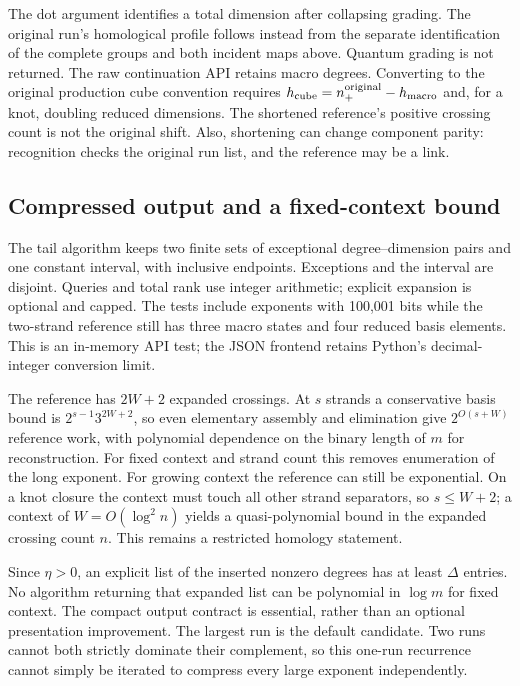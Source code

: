 The dot argument identifies a total dimension after collapsing grading.
The original run's homological profile follows instead from the separate
identification of the complete groups and both incident maps above.
Quantum grading is not returned. The raw continuation API retains macro
degrees. Converting to the original production cube convention requires
$h_{\rm cube}=n_+^{\rm original}-h_{\rm macro}$ and, for a knot, doubling
reduced dimensions. The shortened reference's positive crossing count is
not the original shift. Also, shortening can change component parity:
recognition checks the original run list, and the reference may be a link.

\subsection{Compressed output and a fixed-context bound}
The tail algorithm keeps two finite sets of exceptional degree--dimension
pairs and one constant interval, with inclusive endpoints. Exceptions and
the interval are disjoint. Queries and total rank use integer arithmetic;
explicit expansion is optional and capped. The tests include exponents with
100,001 bits while the two-strand reference still has three macro states
and four reduced basis elements. This is an in-memory API test; the JSON
frontend retains Python's decimal-integer conversion limit.

The reference has $2W+2$ expanded crossings. At $s$ strands a conservative
basis bound is $2^{s-1}3^{2W+2}$, so even elementary assembly and elimination
give $2^{O(s+W)}$ reference work, with polynomial dependence on the binary
length of $m$ for reconstruction. For fixed context and strand count this
removes enumeration of the long exponent. For growing context the reference
can still be exponential. On a knot closure the context must touch all
other strand separators, so $s\le W+2$; a context of
$W=O(\log^2 n)$ yields a quasi-polynomial bound in the expanded crossing
count $n$. This remains a restricted homology statement.

Since $\eta>0$, an explicit list of the inserted nonzero degrees has at
least $\Delta$ entries. No algorithm returning that expanded list can be
polynomial in $\log m$ for fixed context. The compact output contract is
essential, rather than an optional presentation improvement. The largest
run is the default candidate. Two runs cannot both strictly dominate their
complement, so this one-run recurrence cannot simply be iterated to compress
every large exponent independently.

